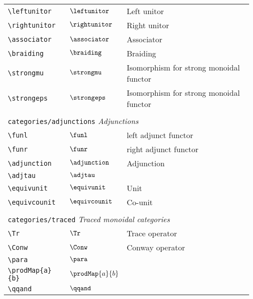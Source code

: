 \begin{longtable}{lll}
 {\color[rgb]{0.5,0.5,0.5}\texttt{\textbackslash leftunitor}} & $\leftunitor$ &  Left unitor\\ 
 {\color[rgb]{0.5,0.5,0.5}\texttt{\textbackslash rightunitor}} & $\rightunitor$ &  Right unitor\\ 
 {\color[rgb]{0.5,0.5,0.5}\texttt{\textbackslash associator}} & $\associator$ &  Associator\\ 
 {\color[rgb]{0.5,0.5,0.5}\texttt{\textbackslash braiding}} & $\braiding$ &  Braiding\\ 
 {\color[rgb]{0.5,0.5,0.5}\texttt{\textbackslash strongmu}} & $\strongmu$ &  Isomorphism for strong monoidal functor\\ 
 {\color[rgb]{0.5,0.5,0.5}\texttt{\textbackslash strongeps}} & $\strongeps$ &  Isomorphism for strong monoidal functor\\ 
  &  & \\ 
 \multicolumn{3}{l}{{\color[rgb]{0.5,0.5,0.5}\texttt{categories/adjunctions}} \emph{Adjunctions}}\\ 
 \hline
{\color[rgb]{0.5,0.5,0.5}\texttt{\textbackslash funl}} & $\funl$ &  left adjunct functor\\ 
 {\color[rgb]{0.5,0.5,0.5}\texttt{\textbackslash funr}} & $\funr$ &  right adjunct functor\\ 
 {\color[rgb]{0.5,0.5,0.5}\texttt{\textbackslash adjunction}} & $\adjunction$ &  Adjunction\\ 
 {\color[rgb]{0.5,0.5,0.5}\texttt{\textbackslash adjtau}} & $\adjtau$ & \\ 
 {\color[rgb]{0.5,0.5,0.5}\texttt{\textbackslash equivunit}} & $\equivunit$ &  Unit\\ 
 {\color[rgb]{0.5,0.5,0.5}\texttt{\textbackslash equivcounit}} & $\equivcounit$ &  Co-unit\\ 
  &  & \\ 
 \multicolumn{3}{l}{{\color[rgb]{0.5,0.5,0.5}\texttt{categories/traced}} \emph{Traced monoidal categories}}\\ 
 \hline
{\color[rgb]{0.5,0.5,0.5}\texttt{\textbackslash Tr}} & $\Tr$ &  Trace operator\\ 
 {\color[rgb]{0.5,0.5,0.5}\texttt{\textbackslash Conw}} & $\Conw$ &  Conway operator\\ 
 {\color[rgb]{0.5,0.5,0.5}\texttt{\textbackslash para}} & $\para$ & \\ 
 {\color[rgb]{0.5,0.5,0.5}\texttt{\textbackslash prodMap\{a\}\{b\}}} & $\prodMap{a}{b}$ & \\ 
 {\color[rgb]{0.5,0.5,0.5}\texttt{\textbackslash qqand}} & $\qqand$ & \\ 

\end{longtable}
